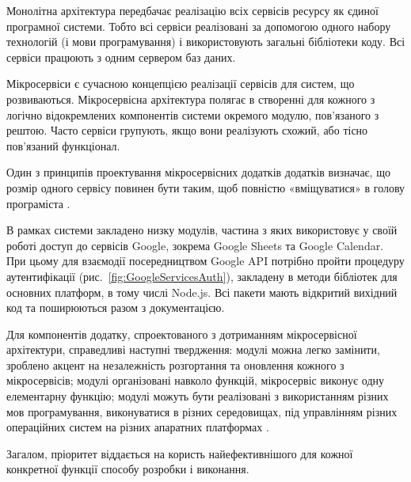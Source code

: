 \label{subsec:microservices}

Монолітна архітектура передбачає реалізацію всіх сервісів ресурсу як єдиної програмної системи. Тобто всі сервіси реалізовані за допомогою одного набору технологій (і мови програмування) і використовують загальні бібліотеки коду. Всі сервіси працюють з одним сервером баз даних.

Мікросервіси є сучасною концепцією реалізації сервісів для систем, що розвиваються. Мікросервісна архітектура полягає в створенні для кожного з логічно відокремлених компонентів системи окремого модулю, пов'язаного з рештою. Часто сервіси групують, якщо вони реалізують схожий, або тісно пов'язаний функціонал.  

Один з принципів проектування мікросервісних додатків додатків визначає, що розмір одного сервісу повинен бути таким, щоб повністю «вміщуватися» в голову програміста \cite{приходченко2018обґрунтування}.

В рамках системи закладено низку модулів, частина з яких використовує у своїй роботі доступ до сервісів Google, зокрема Google Sheets та Google Calendar. При цьому для взаємодії посередництвом Google API потрібно пройти процедуру аутентифікації (рис.~\ref{fig:GoogleServicesAuth}), закладену в методи бібліотек для основних платформ, в тому числі Node.js. Всі пакети мають відкритий вихідний код та поширюються разом з документацією.


Для компонентів додатку, спроектованого з дотриманням мікросервісної архітектури, справедливі наступні твердження: модулі можна легко замінити, зроблено акцент на незалежність розгортання та оновлення кожного з мікросервісів; модулі організовані навколо функцій, мікросервіс виконує одну елементарну функцію; модулі можуть бути реалізовані з використанням різних мов програмування, виконуватися в різних середовищах, під управлінням різних операційних систем на різних апаратних платформах \cite{кучер2018мікросервісна}.

Загалом, пріоритет віддається на користь найефективнішого для кожної конкретної функції способу розробки і виконання.
